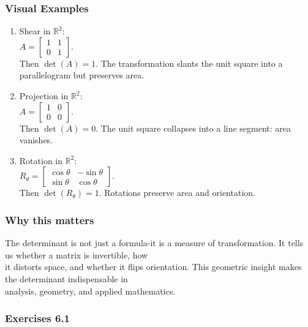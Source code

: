 \documentclass[
  12pt,
  a4paper,
]{article}
\begin{document}
\subsubsection{Visual Examples}\label{visual-examples}

\begin{enumerate}
\def\labelenumi{\arabic{enumi}.}
\item
  Shear in \(\mathbb{R}^2\):\\
  \(A = \begin{bmatrix} 1 & 1 \\ 0 & 1 \end{bmatrix}\).\\
  Then \(\det(A) = 1\). The transformation slants the unit square into a
  parallelogram but preserves area.
\item
  Projection in \(\mathbb{R}^2\):\\
  \(A = \begin{bmatrix} 1 & 0 \\ 0 & 0 \end{bmatrix}\).\\
  Then \(\det(A) = 0\). The unit square collapses into a line segment:
  area vanishes.
\item
  Rotation in \(\mathbb{R}^2\):\\
  \(R_\theta = \begin{bmatrix} \cos\theta & -\sin\theta \\ \sin\theta & \cos\theta \end{bmatrix}\).\\
  Then \(\det(R_\theta) = 1\). Rotations preserve area and orientation.
\end{enumerate}

\subsubsection{Why this matters}\label{why-this-matters-20}

The determinant is not just a formula-it is a measure of transformation.
It tells us whether a matrix is invertible, how\\
it distorts space, and whether it flips orientation. This geometric
insight makes the determinant indispensable in\\
analysis, geometry, and applied mathematics.

\subsubsection{Exercises 6.1}\label{exercises-61}
\end{document}
